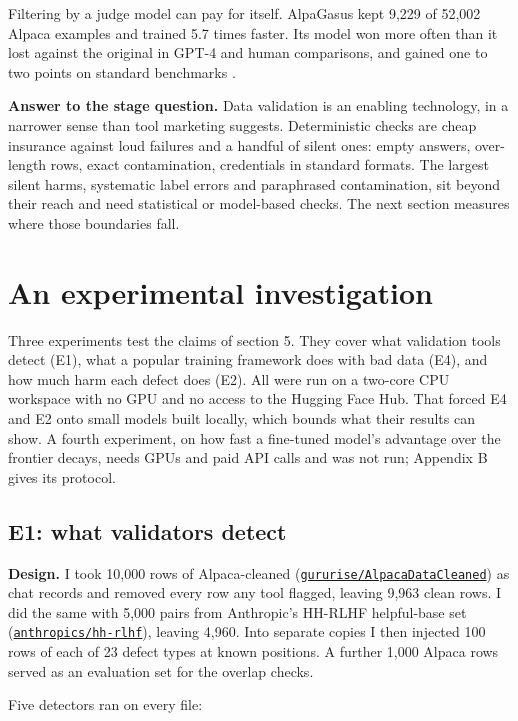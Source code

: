Filtering by a judge model can pay for itself. AlpaGasus kept 9,229 of 52,002 Alpaca examples and trained 5.7 times faster. Its model won more often than it lost against the original in GPT-4 and human comparisons, and gained one to two points on standard benchmarks \citep{chen2024alpagasus}.

\textbf{Answer to the stage question.} Data validation is an enabling technology, in a narrower sense than tool marketing suggests. Deterministic checks are cheap insurance against loud failures and a handful of silent ones: empty answers, over-length rows, exact contamination, credentials in standard formats. The largest silent harms, systematic label errors and paraphrased contamination, sit beyond their reach and need statistical or model-based checks. The next section measures where those boundaries fall.

\section{An experimental investigation}\label{sec:experiments}

Three experiments test the claims of section 5. They cover what validation tools detect (E1), what a popular training framework does with bad data (E4), and how much harm each defect does (E2). All were run on a two-core CPU workspace with no GPU and no access to the Hugging Face Hub. That forced E4 and E2 onto small models built locally, which bounds what their results can show. A fourth experiment, on how fast a fine-tuned model's advantage over the frontier decays, needs GPUs and paid API calls and was not run; Appendix B gives its protocol.

\subsection{E1: what validators detect}

\textbf{Design.} I took 10,000 rows of Alpaca-cleaned (\href{https://github.com/gururise/AlpacaDataCleaned}{\texttt{gururise/AlpacaDataCleaned}}) as chat records and removed every row any tool flagged, leaving 9,963 clean rows. I did the same with 5,000 pairs from Anthropic's HH-RLHF helpful-base set (\href{https://github.com/anthropics/hh-rlhf}{\texttt{anthropics/hh-rlhf}}), leaving 4,960. Into separate copies I then injected 100 rows of each of 23 defect types at known positions. A further 1,000 Alpaca rows served as an evaluation set for the overlap checks.

Five detectors ran on every file:

